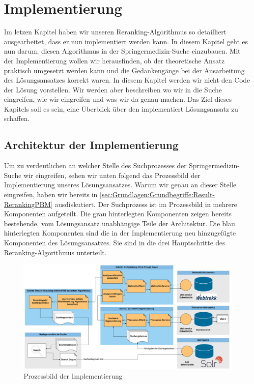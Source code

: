 %
\chapter{Implementierung}
\label{sec:Implementierung}

Im letzen Kapitel haben wir unseren Reranking-Algorithmus so detailliert ausgearbeitet, dass er nun implementiert werden kann. In diesem Kapitel geht es nun darum, diesen Algorithmus in der Springermedizin-Suche einzubauen. Mit der Implementierung wollen wir herausfinden, ob der theoretische Ansatz praktisch umgesetzt werden kann und die Gedankengänge bei der Ausarbeitung des Lösungsansatzes korrekt waren. In diesem Kapitel werden wir nicht den Code der Lösung vorstellen. Wir werden aber beschreiben wo wir in die Suche eingreifen, wie wir eingreifen und was wir da genau machen. Das Ziel dieses Kapitels soll es sein, eine Überblick über den implementiert Lösungsansatz zu schaffen.

\section{Architektur der Implementierung}
\label{sec:Implementierung:Architektur}

Um zu verdeutlichen an welcher Stelle des Suchprozesses der Springermedizin-Suche wir eingreifen, sehen wir unten folgend das Prozessbild der Implementierung unseres Lösungsansatzes. Warum wir genau an dieser Stelle eingreifen, haben wir bereits in \ref{sec:Grundlagen:Grundbegriffe:Result-RerankingPBM} ausdiskutiert. Der Suchprozess ist im Prozessbild in mehrere Komponenten aufgeteilt. Die grau hinterlegten Komponenten zeigen bereits bestehende, vom Lösungsansatz unabhängige Teile der Architektur. Die blau hinterlegten Komponenten sind die in der Implementierung neu hinzugefügte Komponenten des Lösungsansatzes. Sie sind in die drei Hauptschritte des Reranking-Algorithmus unterteilt.

\begin{figure}[H]
\centering
\vspace{-1em}
\caption[Prozessbild der Implementierung]{Prozessbild der Implementierung}
\label{fig:ProzessbildImplementierung}
\includegraphics[width=\linewidth]{gfx/ImplementierungProzessbild}
\vspace{-2.5em}
\end{figure}

